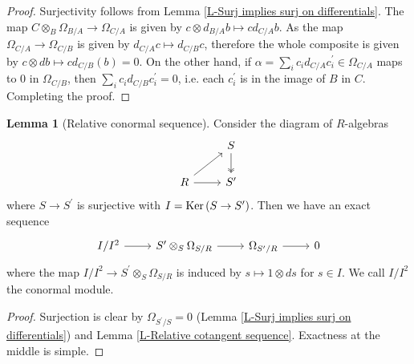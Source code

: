 \documentclass[letterpaper,10pt,twoside]{amsart}
\newcommand{\Ker}[1]{{\fontfamily{lmss}\selectfont 
		\text{\rm Ker}\left (#1\right )
}}
\newcommand{\tens}{\otimes}
\theoremstyle{proposition}
\theoremstyle{definition}
\theoremstyle{theorem}
\theoremstyle{definition}
\theoremstyle{definition}
\theoremstyle{definition}
\theoremstyle{lemma}
\newtheorem{lemma}[proposition]{\textbf{Lemma}}
\theoremstyle{definition}
\theoremstyle{definition}
\theoremstyle{corollary}
\theoremstyle{definition}
\begin{document}
	\begin{proof}
		Surjectivity follows from Lemma \ref{L-Surj implies surj on differentials}. The map $C\tens_{B} \Omega_{B/A} \to \Omega_{C/A}$ is given by $c\tens d_{B/A}b \mapsto cd_{C/A}b$. As the map $\Omega_{C/A} \to \Omega_{C/B}$ is given by $d_{C/A}c \mapsto d_{C/B}c$, therefore the whole composite is given by $c\tens db \mapsto cd_{C/B}(b) = 0$. On the other hand, if $\alpha = \sum_{i}c_i d_{C/A}c_i^{\prime} \in \Omega_{C/A}$ maps to $0$ in $\Omega_{C/B}$, then $\sum_{i}c_i d_{C/B}c_i^{\prime} = 0$, i.e. each $c_i^{\prime}$ is in the image of $B$ in $C$. Completing the proof.
	\end{proof}
	\begin{lemma}[Relative conormal sequence]
		Consider the diagram of $R$-algebras
	\[\begin{tikzcd}
		& S \\
		R & {S^\prime}
		\arrow[two heads, from=1-2, to=2-2]
		\arrow[from=2-1, to=1-2]
		\arrow[from=2-1, to=2-2]
	\end{tikzcd}\]
	where $S\to S^{\prime}$ is surjective with $I = \Ker{S\to S^{\prime}}$. Then we have an exact sequence
	\[\begin{tikzcd}
		{I/I^2} & {S^\prime\tens_S\Omega_{S/R}} & {\Omega_{S^\prime/R}} & 0
		\arrow[from=1-1, to=1-2]
		\arrow[from=1-2, to=1-3]
		\arrow[from=1-3, to=1-4]
	\end{tikzcd}\]
	where the map $I/I^2 \to S^{\prime}\tens_{S} \Omega_{S/R}$ is induced by $s\mapsto 1\tens ds$ for $s\in I$. We call $I/I^{2}$ the conormal module.
	\end{lemma}
	\begin{proof}
		Surjection is clear by $\Omega_{S^{\prime}/S} = 0$ (Lemma \ref{L-Surj implies surj on differentials}) and Lemma \ref{L-Relative cotangent sequence}. Exactness at the middle is simple. 
	\end{proof}
\end{document}
